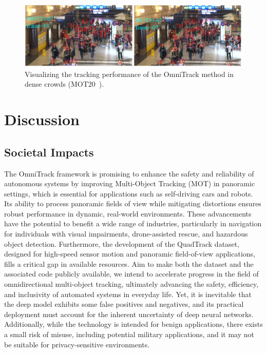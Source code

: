 \begin{figure}[!t]
  \centering
  \includegraphics[width=1\textwidth]{imgs/rebuttal/MOT20_v1.pdf}
  \caption{Visualizing the tracking performance of the OmniTrack method in dense crowds (MOT20~\cite{dendorfer2020mot20}).}
  \label{fig:MOT20}
\end{figure}

\section{Discussion}
\subsection{Societal Impacts}
The OmniTrack framework is promising to enhance the safety and reliability of autonomous systems by improving Multi-Object Tracking (MOT) in panoramic settings, which is essential for applications such as self-driving cars and robots.
Its ability to process panoramic fields of view while mitigating distortions ensures robust performance in dynamic, real-world environments. 
These advancements have the potential to benefit a wide range of industries, particularly in navigation for individuals with visual impairments, drone-assisted rescue, and hazardous object detection. Furthermore, the development of the QuadTrack dataset, designed for high-speed sensor motion and panoramic field-of-view applications, fills a critical gap in available resources. 
Aim to make both the dataset and the associated code publicly available, we intend to accelerate progress in the field of omnidirectional multi-object tracking,
%
ultimately advancing the safety, efficiency, and inclusivity of automated systems in everyday life. Yet, it is inevitable that the deep model exhibits some false positives and negatives, and its practical deployment must account for the inherent uncertainty of deep neural networks. 
Additionally, while the technology is intended for benign applications, there exists a small risk of misuse, including potential military applications, and it may not be suitable for privacy-sensitive environments.

